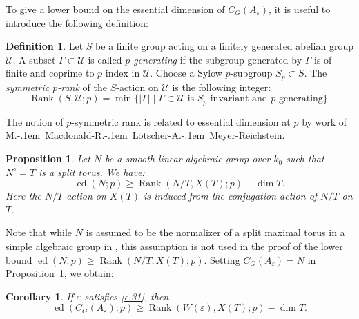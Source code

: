 \documentclass[12pt]{amsart}
\numberwithin{equation}{section}
\newtheorem{proposition}[theorem]{Proposition}
\newtheorem{corollary}[theorem]{Corollary}
\theoremstyle{definition}
\newtheorem{definition}[theorem]{Definition}
\newcommand{\cU}{\mathcal{U}}
\newcommand{\ed}{\operatorname{ed}}
\newcommand{\SymRank}{\operatorname{Rank}}
\newcommand{\eps}{\varepsilon}
\begin{document}
To give a lower bound on the essential dimension of $C_G(A_\eps)$, it is useful to introduce the following definition:
\begin{definition}{\cite{macdonald}}
    Let $S$ be a finite group acting on a finitely generated abelian group $\cU$. A subset $\Gamma \subset \cU$ is called \emph{$p$-generating} if the subgroup generated by $\Gamma$ is of finite and coprime to $p$ index in $\cU$.
    Choose a Sylow $p$-subgroup $S_p\subset S$. The \emph{symmetric $p$-rank} of the $S$-action on $\cU$ is the following integer:
    $$\SymRank(S,\cU;p) = \min\{ | \Gamma| \mid  \Gamma\subset \cU \text{ is } S_p\text{-invariant and }p\text{-generating}\}. $$
\end{definition}
The notion of $p$-symmetric rank is related to essential dimension at $p$ by work of M.\kern-.1em\ Macdonald-R.\kern-.1em\ L\"{o}tscher-A.\kern-.1em\ Meyer-Reichstein.
\begin{proposition}{\cite[Theorem 1.10]{macdonald}}\label{prop.inequa_ed_C(eps)}
    Let $N$ be a smooth linear algebraic group over $k_0$ such that $N^{\circ} = T$ is a split torus. We have:
    $$\ed(N;p) \geq \SymRank(N/T,X(T);p) - \dim T.$$
    Here the $N/T$ action on $X(T)$ is induced from the conjugation action of $N/T$ on $T$.
\end{proposition}
Note that while $N$ is assumed to be the normalizer of a split maximal torus in a simple algebraic group in \cite[Theorem 1.10]{macdonald}, this assumption is not used in the proof of the lower bound $\ed(N;p) \geq \SymRank(N/T,X(T);p)$. Setting $C_G(A_\eps) = N$ in Proposition~\ref{prop.inequa_ed_C(eps)}, we obtain:
\begin{corollary}\label{cor.inequa_ed_C(eps)}
    If $\eps$ satisfies \eqref{e.31}, then $$\ed(C_G(A_\eps);p) \geq \SymRank(W(\eps),X(T);p) - \dim T .$$
\end{corollary}
\end{document}
